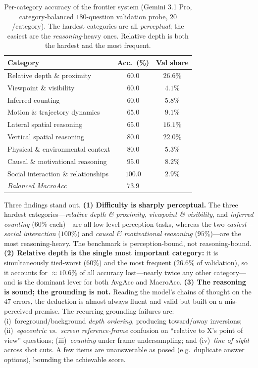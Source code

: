 \documentclass[10pt,twocolumn,letterpaper]{article}
\begin{document}
\begin{table}[t]
\centering\small
\setlength{\tabcolsep}{5pt}
\renewcommand{\arraystretch}{1.1}
\begin{tabular}{@{}l c c@{}}
\toprule
\textbf{Category} & \textbf{Acc.\ (\%)} & \textbf{Val share}\\
\midrule
Relative depth \& proximity        & $60.0$  & $26.6\%$\\
Viewpoint \& visibility            & $60.0$  & $4.1\%$\\
Inferred counting                  & $60.0$  & $5.8\%$\\
Motion \& trajectory dynamics      & $65.0$  & $9.1\%$\\
Lateral spatial reasoning          & $65.0$  & $16.1\%$\\
Vertical spatial reasoning         & $80.0$  & $22.0\%$\\
Physical \& environmental context  & $80.0$  & $5.3\%$\\
Causal \& motivational reasoning   & $95.0$  & $8.2\%$\\
Social interaction \& relationships& $100.0$ & $2.9\%$\\
\midrule
\emph{Balanced MacroAcc}           & $73.9$  & \\
\bottomrule
\end{tabular}
\caption{Per-category accuracy of the frontier system (Gemini 3.1 Pro, category-balanced $180$-question
validation probe, $20$/category). The hardest categories are all \emph{perceptual}; the easiest are the
\emph{reasoning}-heavy ones. Relative depth is both the hardest and the most frequent.}
\label{tab:cat}
\end{table}

\noindent Three findings stand out. \textbf{(1) Difficulty is sharply perceptual.} The three hardest
categories---\emph{relative depth \& proximity}, \emph{viewpoint \& visibility}, and \emph{inferred
counting} ($60\%$ each)---are all low-level perception tasks, whereas the two \emph{easiest}---\emph{social
interaction} ($100\%$) and \emph{causal \& motivational reasoning} ($95\%$)---are the most
reasoning-heavy. The benchmark is perception-bound, not reasoning-bound. \textbf{(2) Relative depth is the
single most important category:} it is simultaneously tied-worst ($60\%$) and the most frequent
($26.6\%$ of validation), so it accounts for ${\approx}10.6\%$ of all accuracy lost---nearly twice any
other category---and is the dominant lever for both AvgAcc and MacroAcc. \textbf{(3) The reasoning is
sound; the grounding is not.} Reading the model's chains of thought on the $47$ errors, the deduction is
almost always fluent and valid but built on a mis-perceived premise. The recurring grounding failures are:
(i)~foreground/background \emph{depth ordering}, producing toward/away inversions; (ii)~\emph{egocentric
vs.\ screen reference-frame} confusion on ``relative to X's point of view'' questions; (iii)~\emph{counting}
under frame undersampling; and (iv)~\emph{line of sight} across shot cuts. A few items are unanswerable as
posed (e.g.\ duplicate answer options), bounding the achievable score.
\end{document}
